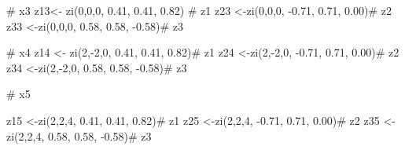 \documentclass[
  letterpaper,
  DIV=11,
  numbers=noendperiod]{scrartcl}
\newenvironment{Shaded}{\begin{snugshade}}{\end{snugshade}}
\newcommand{\CommentTok}[1]{\textcolor[rgb]{0.37,0.37,0.37}{#1}}
\newcommand{\DecValTok}[1]{\textcolor[rgb]{0.68,0.00,0.00}{#1}}
\newcommand{\FloatTok}[1]{\textcolor[rgb]{0.68,0.00,0.00}{#1}}
\newcommand{\FunctionTok}[1]{\textcolor[rgb]{0.28,0.35,0.67}{#1}}
\newcommand{\NormalTok}[1]{\textcolor[rgb]{0.00,0.23,0.31}{#1}}
\newcommand{\OtherTok}[1]{\textcolor[rgb]{0.00,0.23,0.31}{#1}}
\newcommand{\SpecialCharTok}[1]{\textcolor[rgb]{0.37,0.37,0.37}{#1}}
\begin{document}
\begin{Shaded}
\begin{Highlighting}[]
\CommentTok{\# x3}
\NormalTok{z13}\OtherTok{\textless{}{-}} \FunctionTok{zi}\NormalTok{(}\DecValTok{0}\NormalTok{,}\DecValTok{0}\NormalTok{,}\DecValTok{0}\NormalTok{, }\FloatTok{0.41}\NormalTok{, }\FloatTok{0.41}\NormalTok{, }\FloatTok{0.82}\NormalTok{) }\CommentTok{\# z1}
\NormalTok{z23 }\OtherTok{\textless{}{-}}\FunctionTok{zi}\NormalTok{(}\DecValTok{0}\NormalTok{,}\DecValTok{0}\NormalTok{,}\DecValTok{0}\NormalTok{, }\SpecialCharTok{{-}}\FloatTok{0.71}\NormalTok{, }\FloatTok{0.71}\NormalTok{, }\FloatTok{0.00}\NormalTok{)}\CommentTok{\# z2}
\NormalTok{z33 }\OtherTok{\textless{}{-}}\FunctionTok{zi}\NormalTok{(}\DecValTok{0}\NormalTok{,}\DecValTok{0}\NormalTok{,}\DecValTok{0}\NormalTok{, }\FloatTok{0.58}\NormalTok{, }\FloatTok{0.58}\NormalTok{, }\SpecialCharTok{{-}}\FloatTok{0.58}\NormalTok{)}\CommentTok{\# z3}


\CommentTok{\# x4}
\NormalTok{z14 }\OtherTok{\textless{}{-}} \FunctionTok{zi}\NormalTok{(}\DecValTok{2}\NormalTok{,}\SpecialCharTok{{-}}\DecValTok{2}\NormalTok{,}\DecValTok{0}\NormalTok{, }\FloatTok{0.41}\NormalTok{, }\FloatTok{0.41}\NormalTok{, }\FloatTok{0.82}\NormalTok{)}\CommentTok{\# z1}
\NormalTok{z24 }\OtherTok{\textless{}{-}}\FunctionTok{zi}\NormalTok{(}\DecValTok{2}\NormalTok{,}\SpecialCharTok{{-}}\DecValTok{2}\NormalTok{,}\DecValTok{0}\NormalTok{, }\SpecialCharTok{{-}}\FloatTok{0.71}\NormalTok{, }\FloatTok{0.71}\NormalTok{, }\FloatTok{0.00}\NormalTok{)}\CommentTok{\# z2}
\NormalTok{z34 }\OtherTok{\textless{}{-}}\FunctionTok{zi}\NormalTok{(}\DecValTok{2}\NormalTok{,}\SpecialCharTok{{-}}\DecValTok{2}\NormalTok{,}\DecValTok{0}\NormalTok{, }\FloatTok{0.58}\NormalTok{, }\FloatTok{0.58}\NormalTok{, }\SpecialCharTok{{-}}\FloatTok{0.58}\NormalTok{)}\CommentTok{\# z3}

\CommentTok{\# x5}

\NormalTok{z15 }\OtherTok{\textless{}{-}}\FunctionTok{zi}\NormalTok{(}\DecValTok{2}\NormalTok{,}\DecValTok{2}\NormalTok{,}\DecValTok{4}\NormalTok{, }\FloatTok{0.41}\NormalTok{, }\FloatTok{0.41}\NormalTok{, }\FloatTok{0.82}\NormalTok{)}\CommentTok{\# z1}
\NormalTok{z25 }\OtherTok{\textless{}{-}}\FunctionTok{zi}\NormalTok{(}\DecValTok{2}\NormalTok{,}\DecValTok{2}\NormalTok{,}\DecValTok{4}\NormalTok{, }\SpecialCharTok{{-}}\FloatTok{0.71}\NormalTok{, }\FloatTok{0.71}\NormalTok{, }\FloatTok{0.00}\NormalTok{)}\CommentTok{\# z2}
\NormalTok{z35 }\OtherTok{\textless{}{-}}\FunctionTok{zi}\NormalTok{(}\DecValTok{2}\NormalTok{,}\DecValTok{2}\NormalTok{,}\DecValTok{4}\NormalTok{, }\FloatTok{0.58}\NormalTok{, }\FloatTok{0.58}\NormalTok{, }\SpecialCharTok{{-}}\FloatTok{0.58}\NormalTok{)}\CommentTok{\# z3}
\end{Highlighting}
\end{Shaded}
\end{document}
